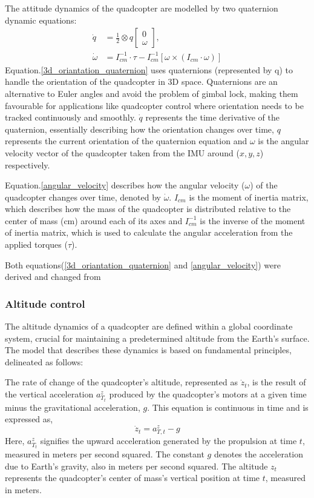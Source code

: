 \documentclass{article}
\begin{document}
The attitude dynamics of the quadcopter are modelled by two quaternion dynamic equations:
\begin{align}
    \dot{q} &= \frac{1}{2} \otimes q\begin{bmatrix} 0 \\ \omega \end{bmatrix}, \label{3d_oriantation_quaternion}\\
    \dot{\omega} &= I_{cm}^{-1} \cdot \tau - I_{cm}^{-1} \left[ \omega \times (I_{cm} \cdot \omega) \right] \label{angular_velocity}
\end{align}
Equation.\ref{3d_oriantation_quaternion} uses quaternions (represented by q) to handle the orientation of the quadcopter in 3D space. Quaternions are an alternative to Euler angles and avoid the problem of gimbal lock, making them favourable for applications like quadcopter control where orientation needs to be tracked continuously and smoothly. \(\dot{q}\) represents the time derivative of the 
quaternion, essentially describing how the orientation changes over time, \(q\) represents the current orientation of the quaternion equation and \(\omega\) is the angular velocity vector of the quadcopter taken from the IMU around (\(x, y, z\)) respectively.

Equation.\ref{angular_velocity} describes how the angular velocity (\(\omega\)) of the quadcopter changes over time, denoted by \(\dot \omega\). \(I_{cm}\) is the moment of inertia matrix, which describes how the mass of the quadcopter is distributed relative to the center of mass (cm) around each of its axes and \(I_{cm}^{-1}\) is the  inverse of the moment of inertia matrix, which is used to calculate the angular 
acceleration from the applied torques (\(\tau\)).

Both equations(\ref{3d_oriantation_quaternion} and \ref{angular_velocity}) were derived and changed from \cite{QuaternionBasedAttitudeControl}

\subsubsection{Altitude control}\label{Altitude_control}
The altitude dynamics of a quadcopter are defined within a global coordinate system, crucial for maintaining a predetermined altitude from the Earth's surface. The model that describes these dynamics is based on fundamental principles, delineated as follows:

The rate of change of the quadcopter's altitude, represented as \( \dot{z}_t \), is the result of the vertical acceleration \( a^z_{T_t} \) produced by the quadcopter's motors at a given time minus the gravitational acceleration, \( g \). This equation is continuous in time and is expressed as,
\begin{equation}
\dot{z}_t = a^z_{T,t} - g
\end{equation}
\noindent
Here, \( a^z_{T_t} \) signifies the upward acceleration generated by the propulsion at time \( t \), measured in meters per second squared. The constant \( g \) denotes the acceleration due to Earth's gravity, also in meters per second squared. The altitude \( z_t \) represents the quadcopter's center of mass's vertical position at time \( t \), measured in meters.
\end{document}
